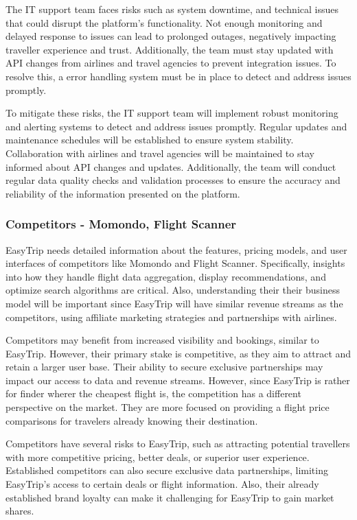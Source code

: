 The IT support team faces risks such as system downtime, and technical issues that could disrupt the platform's functionality. Not enough monitoring and delayed response to issues can lead to prolonged outages, negatively impacting traveller experience and trust. Additionally, the team must stay updated with API changes from airlines and travel agencies to prevent integration issues. To resolve this, a error handling system must be in place to detect and address issues promptly.

To mitigate these risks, the IT support team will implement robust monitoring and alerting systems to detect and address issues promptly. Regular updates and maintenance schedules will be established to ensure system stability. Collaboration with airlines and travel agencies will be maintained to stay informed about API changes and updates. Additionally, the team will conduct regular data quality checks and validation processes to ensure the accuracy and reliability of the information presented on the platform.

\subsubsection{Competitors - Momondo, Flight Scanner}
EasyTrip needs detailed information about the features, pricing models, and user interfaces of competitors like Momondo and Flight Scanner. Specifically, insights into how they handle flight data aggregation, display recommendations, and optimize search algorithms are critical. Also, understanding their their business model will be important since EasyTrip will have similar revenue streams as the competitors, using affiliate marketing strategies and partnerships with airlines.

Competitors may benefit from increased visibility and bookings, similar to EasyTrip. However, their primary stake is competitive, as they aim to attract and retain a larger user base. Their ability to secure exclusive partnerships may impact our access to data and revenue streams. However, since EasyTrip is rather for finder wherer the cheapest flight is, the competition has a different perspective on the market. They are more focused on providing a flight price comparisons for travelers already knowing their destination.

Competitors have several risks to EasyTrip, such as attracting potential travellers with more competitive pricing, better deals, or superior user experience. Established competitors can also secure exclusive data partnerships, limiting EasyTrip’s access to certain deals or flight information. Also, their already established brand loyalty can make it challenging for EasyTrip to gain market shares.


